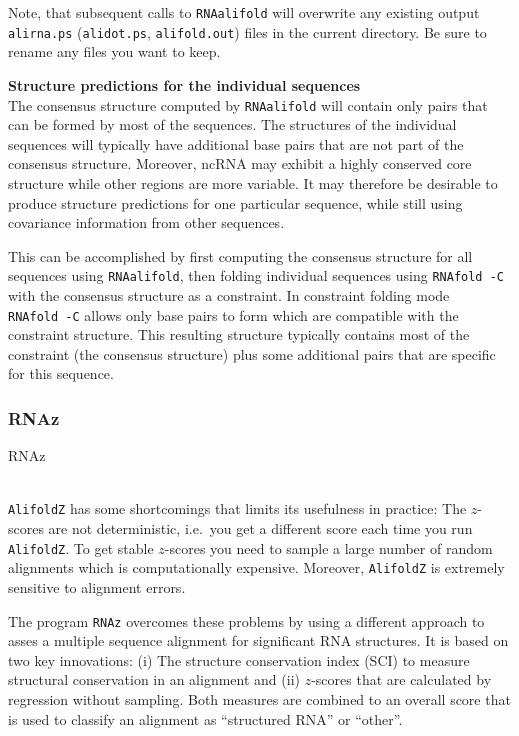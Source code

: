 \documentclass[]{article}
\begin{document}
Note, that subsequent calls to \texttt{RNAalifold} will overwrite any
existing output \texttt{alirna.ps} (\texttt{alidot.ps},
\texttt{alifold.out}) files in the current directory. Be sure to rename
any files you want to keep.

\textbf{Structure predictions for the individual sequences}\\
The consensus structure computed by \texttt{RNAalifold} will contain
only pairs that can be formed by most of the sequences. The structures
of the individual sequences will typically have additional base pairs
that are not part of the consensus structure. Moreover, ncRNA may
exhibit a highly conserved core structure while other regions are more
variable. It may therefore be desirable to produce structure predictions
for one particular sequence, while still using covariance information
from other sequences.

This can be accomplished by first computing the consensus structure for
all sequences using \texttt{RNAalifold}, then folding individual
sequences using \texttt{RNAfold\ -C} with the consensus structure as a
constraint. In constraint folding mode \texttt{RNAfold\ -C} allows only
base pairs to form which are compatible with the constraint structure.
This resulting structure typically contains most of the constraint (the
consensus structure) plus some additional pairs that are specific for
this sequence.

\subsubsection{RNAz}{RNAz}\label{rnaz}

\\
\texttt{AlifoldZ} has some shortcomings that limits its usefulness in
practice: The \(z\)-scores are not deterministic, i.e.~you get a
different score each time you run \texttt{AlifoldZ}. To get stable
\(z\)-scores you need to sample a large number of random alignments
which is computationally expensive. Moreover, \texttt{AlifoldZ} is
extremely sensitive to alignment errors.

The program \texttt{RNAz} overcomes these problems by using a different
approach to asses a multiple sequence alignment for significant RNA
structures. It is based on two key innovations: (i) The structure
conservation index (SCI) to measure structural conservation in an
alignment and (ii) \(z\)-scores that are calculated by regression
without sampling. Both measures are combined to an overall score that is
used to classify an alignment as ``structured RNA'' or ``other''.
\end{document}
